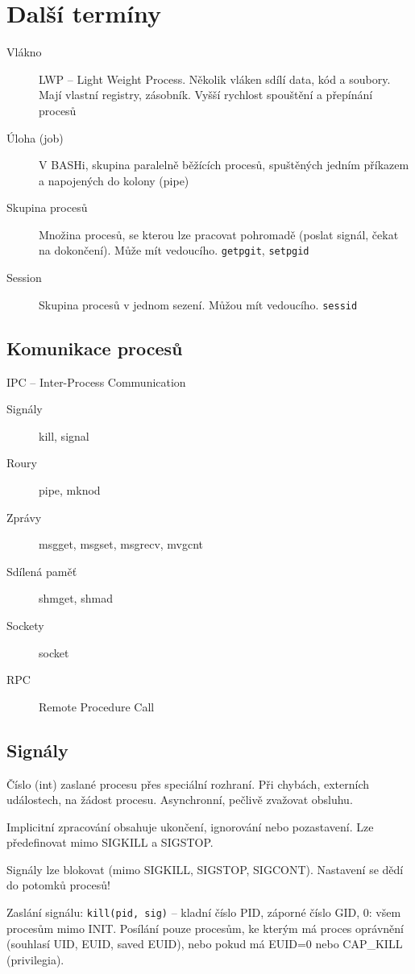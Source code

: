 \documentclass[a4wide]{report}
\begin{document}
\section{Další termíny}
\begin{description}
	\item[Vlákno] LWP -- Light Weight Process. Několik vláken sdílí data, kód a soubory. Mají vlastní registry, zásobník. Vyšší rychlost spouštění a přepínání procesů
	\item[Úloha (job)] V BASHi, skupina paralelně běžících procesů, spuštěných jedním příkazem a napojených do kolony (pipe)
	\item[Skupina procesů] Množina procesů, se kterou lze pracovat pohromadě (poslat signál, čekat na dokončení). Může mít vedoucího. \verb|getpgit|, \verb|setpgid|
	\item[Session] Skupina procesů v jednom sezení. Můžou mít vedoucího. \verb|sessid|
\end{description}

\subsection{Komunikace procesů}
IPC -- Inter-Process Communication
\begin{description}
	\item[Signály] kill, signal
	\item[Roury] pipe, mknod
	\item[Zprávy] msgget, msgset, msgrecv, mvgcnt
	\item[Sdílená paměť] shmget, shmad
	\item[Sockety] socket
	\item[RPC] Remote Procedure Call
\end{description}

\subsection{Signály}

Číslo (int) zaslané procesu přes speciální rozhraní. Při chybách, externích událostech, na žádost procesu. Asynchronní, pečlivě zvažovat obsluhu.

Implicitní zpracování obsahuje ukončení, ignorování nebo pozastavení. Lze předefinovat mimo SIGKILL a SIGSTOP.

Signály lze blokovat (mimo SIGKILL, SIGSTOP, SIGCONT). Nastavení se dědí do potomků procesů!

Zaslání signálu: \verb|kill(pid, sig)| -- kladní číslo PID, záporné číslo GID, 0: všem procesům mimo INIT. Posílání pouze procesům, ke kterým má proces oprávnění (souhlasí UID, EUID, saved EUID), nebo pokud má EUID=0 nebo CAP\_KILL (privilegia). 
\end{document}
